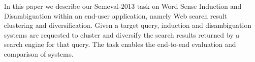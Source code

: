 In this paper we describe our Semeval-2013 task on Word Sense Induction and Disambiguation within an end-user application, namely Web search result
 clustering and diversification. Given a target query, induction and
 disambiguation systems are requested to cluster and diversify the search
 results returned by a search engine for that query. The task enables the
 end-to-end evaluation and comparison of systems.

